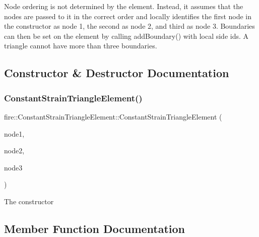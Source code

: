 Node ordering is not determined by the element. Instead, it assumes that the nodes are passed to it in the correct order and locally identifies the first node in the constructor as node 1, the second as node 2, and third as node 3. Boundaries can then be set on the element by calling add\+Boundary() with local side ids. A triangle cannot have more than three boundaries. 

\subsection{Constructor \& Destructor Documentation}
\mbox{\label{a00773_aa54c09f1dd7cacaf1f4f0b1428859c00}} 
\subsubsection{\texorpdfstring{Constant\+Strain\+Triangle\+Element()}{ConstantStrainTriangleElement()}}
{\footnotesize\ttfamily fire\+::\+Constant\+Strain\+Triangle\+Element\+::\+Constant\+Strain\+Triangle\+Element (\begin{DoxyParamCaption}\item[{const \hyperlink{a00198_a92dafcc05a788e1065a5792b67f0f70e}{Two\+D\+Node} \&}]{node1,  }\item[{const \hyperlink{a00198_a92dafcc05a788e1065a5792b67f0f70e}{Two\+D\+Node} \&}]{node2,  }\item[{const \hyperlink{a00198_a92dafcc05a788e1065a5792b67f0f70e}{Two\+D\+Node} \&}]{node3 }\end{DoxyParamCaption})}

The constructor 

\subsection{Member Function Documentation}
\mbox{\label{a00773_a7f4a8e6d0fece8943963f615caf70f09}} 
